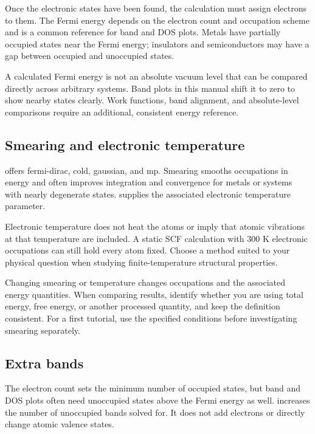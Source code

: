 Once the electronic states have been found, the calculation must assign electrons to them. The Fermi energy depends on the electron count and occupation scheme and is a common reference for band and DOS plots. Metals have partially occupied states near the Fermi energy; insulators and semiconductors may have a gap between occupied and unoccupied states.

A calculated Fermi energy is not an absolute vacuum level that can be compared directly across arbitrary systems. Band plots in this manual shift it to zero to show nearby states clearly. Work functions, band alignment, and absolute-level comparisons require an additional, consistent energy reference.

\subsection{Smearing and electronic temperature}

 offers fermi-dirac, cold, gaussian, and mp. Smearing smooths occupations in energy and often improves integration and convergence for metals or systems with nearly degenerate states.  supplies the associated electronic temperature parameter.

Electronic temperature does not heat the atoms or imply that atomic vibrations at that temperature are included. A static SCF calculation with $300$ K electronic occupations can still hold every atom fixed. Choose a method suited to your physical question when studying finite-temperature structural properties.

Changing smearing or temperature changes occupations and the associated energy quantities. When comparing results, identify whether you are using total energy, free energy, or another processed quantity, and keep the definition consistent. For a first tutorial, use the specified conditions before investigating smearing separately.

\subsection{Extra bands}

The electron count sets the minimum number of occupied states, but band and DOS plots often need unoccupied states above the Fermi energy as well.  increases the number of unoccupied bands solved for. It does not add electrons or directly change atomic valence states.


